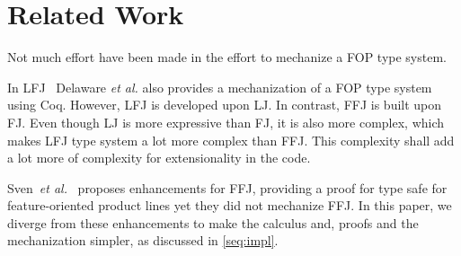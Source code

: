 \section{Related Work}\label{seq:related}
Not much effort have been made in the effort to mechanize a \ac{FOP} type system.

In \ac{LFJ}~\cite{delaware_machine-checked_2009} Delaware \textit{et al.}
also provides a mechanization of a \ac{FOP} type system using Coq. 
However, \ac{LFJ} is developed upon \ac{LJ}. In contrast, \ac{FFJ} is built upon \ac{FJ}.
Even though \ac{LJ} is more expressive than \ac{FJ}, it is also more complex,
which makes \ac{LFJ} type system a lot more complex than \ac{FFJ}. This complexity
shall add a lot more of complexity for extensionality in the code.

Sven~\textit{et al.}~\cite{prehofer_feature-oriented_1997} proposes enhancements for \ac{FFJ},
providing a proof for type safe for feature-oriented product lines yet they did not mechanize \ac{FFJ}.
In this paper, we diverge from these enhancements to make the calculus and, proofs and the mechanization simpler, as discussed
in \ref{seq:impl}.
